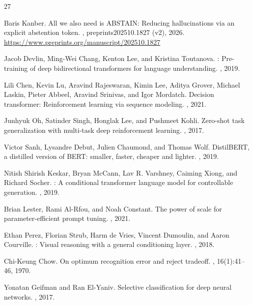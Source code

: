 \documentclass[11pt]{article}
\begin{document}
\begin{thebibliography}{27}

Baris Kanber.
\newblock All we also need is ABSTAIN: Reducing hallucinations via an explicit abstention token.
, preprints202510.1827 (v2), 2026.
\newblock \url{https://www.preprints.org/manuscript/202510.1827}

Jacob Devlin, Ming-Wei Chang, Kenton Lee, and Kristina Toutanova.
: Pre-training of deep bidirectional transformers for language understanding.
, 2019.

Lili Chen, Kevin Lu, Aravind Rajeswaran, Kimin Lee, Aditya Grover, Michael Laskin, Pieter Abbeel, Aravind Srinivas, and Igor Mordatch.
\newblock Decision transformer: Reinforcement learning via sequence modeling.
, 2021.

Junhyuk Oh, Satinder Singh, Honglak Lee, and Pushmeet Kohli.
\newblock Zero-shot task generalization with multi-task deep reinforcement learning.
, 2017.

Victor Sanh, Lysandre Debut, Julien Chaumond, and Thomas Wolf.
\newblock Distil{BERT}, a distilled version of {BERT}: smaller, faster, cheaper and lighter.
, 2019.

Nitish Shirish Keskar, Bryan McCann, Lav R. Varshney, Caiming Xiong, and Richard Socher.
: A conditional transformer language model for controllable generation.
, 2019.

Brian Lester, Rami Al-Rfou, and Noah Constant.
\newblock The power of scale for parameter-efficient prompt tuning.
, 2021.

Ethan Perez, Florian Strub, Harm de Vries, Vincent Dumoulin, and Aaron Courville.
: Visual reasoning with a general conditioning layer.
, 2018.

Chi-Keung Chow.
\newblock On optimum recognition error and reject tradeoff.
, 16(1):41--46, 1970.

Yonatan Geifman and Ran El-Yaniv.
\newblock Selective classification for deep neural networks.
, 2017.


\end{thebibliography}
\end{document}
